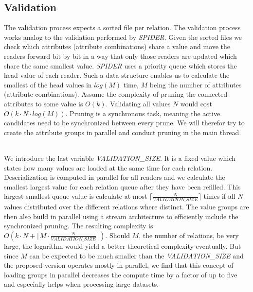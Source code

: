 \subsection{Validation}\label{sec:spind_val}
The validation process expects a sorted file per relation. The validation process works analog to the validation performed by \textit{SPIDER}. Given the sorted files we check which attributes (attribute combinations) share a value and move the readers forward bit by bit in a way that only those readers are updated which share the same smallest value. \textit{SPIDER} uses a priority queue which stores the head value of each reader. Such a data structure enables us to calculate the smallest of the head values in $log(M)$ time, $M$ being the number of attributes (attribute combinations). Assume the complexity of pruning the connected attributes to some value is $O(k)$. Validating all values $N$ would cost $O(k \cdot N \cdot log(M))$. Pruning is a synchronous task, meaning the active candidates need to be synchronized between every prune. We will therefor try to create the attribute groups in parallel and conduct pruning in the main thread.

\noindent \\ We introduce the last variable \textit{VALIDATION\_SIZE}. It is a fixed value which states how many values are loaded at the same time for each relation. Deserialization is computed in parallel for all readers and we calculate the smallest largest value for each relation queue after they have been refilled. This largest smallest queue value is calculate at most $\lceil\frac{N}{\textit{VALIDATION\_SIZE}}\rceil$ times if all $N$ values distributed over the different relations where distinct. The value groups are then also build in parallel using a stream architecture to efficiently include the synchronized pruning. The resulting complexity is  $O(k \cdot N + \lceil M \cdot \frac{N}{\textit{VALIDATION\_SIZE}}\rceil)$. Should $M$, the number of relations, be very large, the logarithm would yield a better theoretical complexity eventually. But since $M$ can be expected to be much smaller than the \textit{VALIDATION\_SIZE} and the proposed version operates mostly in parallel, we find that this concept of loading groups in parallel decreases the compute time by a factor of up to five and especially helps when processing large datasets.

